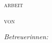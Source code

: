 \begin{titlepage}
\begin{center}
\vspace{.75cm}

\textsc{\Large \thesistype arbeit}\\[1cm] %

%
{\huge \bfseries \ttitle\par}\vspace{1.5cm} %



\textsc{\Large von}\\[.25cm]

{\Large \authorname}

\vspace{.75cm}

\emph{Betreuerinnen:} \\
\supname\\[1cm]

\groupname%

\vfill

{\large \tdate} %


\vfill
\end{center}

\restoregeometry

\end{titlepage}


